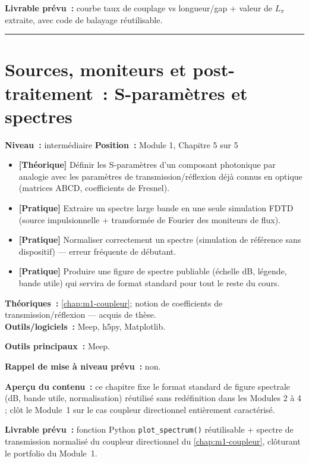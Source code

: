 \noindent\textbf{Livrable prévu~:} courbe taux de couplage vs longueur/gap + valeur de $L_\pi$ extraite, avec code de balayage réutilisable.

\bigskip\hrule\bigskip

\chapter{Sources, moniteurs et post-traitement~: S-paramètres et spectres}
\label{chap:m1-postraitement}

\noindent\textbf{Niveau~:} intermédiaire \hfill \textbf{Position~:} Module 1, Chapitre 5 sur 5

\begin{objectifs}
\begin{itemize}[leftmargin=1.4em]
  \item \textbf{[Théorique]} Définir les S-paramètres d'un composant photonique par analogie avec les paramètres de transmission/réflexion déjà connus en optique (matrices ABCD, coefficients de Fresnel).
  \item \textbf{[Pratique]} Extraire un spectre large bande en une seule simulation FDTD (source impulsionnelle + transformée de Fourier des moniteurs de flux).
  \item \textbf{[Pratique]} Normaliser correctement un spectre (simulation de référence sans dispositif) — erreur fréquente de débutant.
  \item \textbf{[Pratique]} Produire une figure de spectre publiable (échelle dB, légende, bande utile) qui servira de format standard pour tout le reste du cours.
\end{itemize}
\end{objectifs}

\begin{prerequis}
\textbf{Théoriques~:} \cref{chap:m1-coupleur}; notion de coefficients de transmission/réflexion — acquis de thèse.\\
\textbf{Outils/logiciels~:} Meep, h5py, Matplotlib.
\end{prerequis}

\noindent\textbf{Outils principaux~:} Meep.

\noindent\textbf{Rappel de mise à niveau prévu~:} non.

\noindent\textbf{Aperçu du contenu~:} ce chapitre fixe le format standard de figure spectrale (dB, bande utile, normalisation) réutilisé sans redéfinition dans les Modules 2 à 4 ; clôt le Module~1 sur le cas coupleur directionnel entièrement caractérisé.

\noindent\textbf{Livrable prévu~:} fonction Python \texttt{plot\_spectrum()} réutilisable + spectre de transmission normalisé du coupleur directionnel du \cref{chap:m1-coupleur}, clôturant le portfolio du Module~1.
